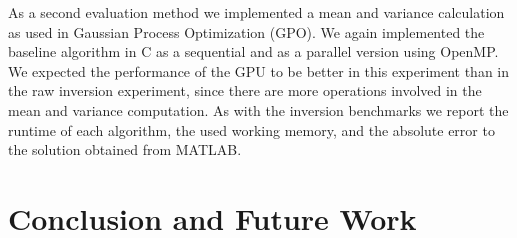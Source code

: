 \documentclass[11pt]{article}
\begin{document}
As a second evaluation method we implemented a mean and variance calculation as used in Gaussian Process Optimization (GPO). We again implemented the baseline algorithm in C as a sequential and as a parallel version using OpenMP. We expected the performance of the GPU to be better in this experiment than in the raw inversion experiment, since there are more operations involved in the mean and variance computation. As with the inversion benchmarks we report the runtime of each algorithm, the used working memory, and the absolute error to the solution obtained from MATLAB.

\section{Conclusion and Future Work}

\newpage



\end{document}
